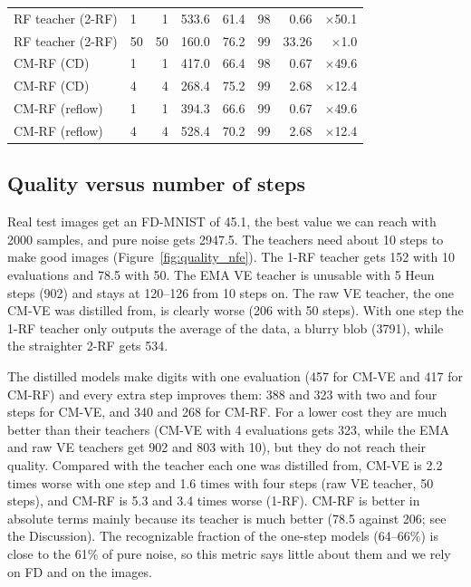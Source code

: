 \documentclass{article}
\begin{document}
\begin{table}[!htbp]
\begin{tabular}{llrrrrrr}
    RF teacher (2-RF) & 1 & 1 & 533.6 & 61.4 & 98 & 0.66 & $\times$50.1 \\
    RF teacher (2-RF) & 50 & 50 & 160.0 & 76.2 & 99 & 33.26 & $\times$1.0 \\
    \midrule
    CM-RF (CD) & 1 & 1 & 417.0 & 66.4 & 98 & 0.67 & $\times$49.6 \\
    CM-RF (CD) & 4 & 4 & 268.4 & 75.2 & 99 & 2.68 & $\times$12.4 \\
    \midrule
    CM-RF (reflow) & 1 & 1 & 394.3 & 66.6 & 99 & 0.67 & $\times$49.6 \\
    CM-RF (reflow) & 4 & 4 & 528.4 & 70.2 & 99 & 2.68 & $\times$12.4 \\
    \bottomrule
  \end{tabular}
\end{table}

\subsection{Quality versus number of steps}

Real test images get an FD-MNIST of 45.1, the best value we can reach with 2000
samples, and pure noise gets 2947.5. The teachers need about 10 steps to make
good images (Figure~\ref{fig:quality_nfe}). The 1-RF teacher gets 152 with 10
evaluations and 78.5 with 50. The EMA VE teacher is unusable with 5 Heun steps
(902) and stays at 120--126 from 10 steps on. The raw VE teacher, the one CM-VE
was distilled from, is clearly worse (206 with 50 steps). With one step the 1-RF
teacher only outputs the average of the data, a blurry blob (3791), while the
straighter 2-RF gets 534.

The distilled models make digits with one evaluation (457 for CM-VE and 417 for
CM-RF) and every extra step improves them: 388 and 323 with two and four steps
for CM-VE, and 340 and 268 for CM-RF. For a lower cost they are much better than
their teachers (CM-VE with 4 evaluations gets 323, while the EMA and raw VE
teachers get 902 and 803 with 10), but they do not reach their quality. Compared
with the teacher each one was distilled from, CM-VE is 2.2 times worse with one
step and 1.6 times with four steps (raw VE teacher, 50 steps), and CM-RF is 5.3
and 3.4 times worse (1-RF). CM-RF is better in absolute terms mainly because its
teacher is much better (78.5 against 206; see the Discussion). The recognizable fraction of the
one-step models (64--66\%) is close to the 61\% of pure noise, so this metric
says little about them and we rely on FD and on the images.
\end{document}
